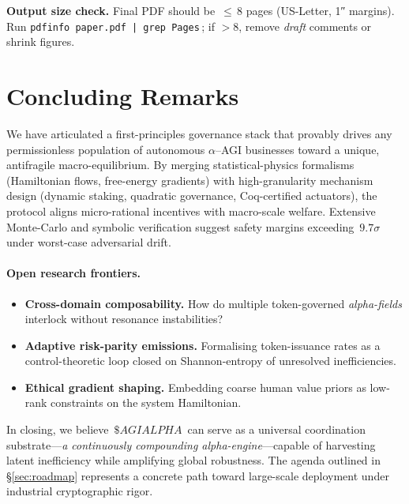 \documentclass[11pt]{article}
\theoremstyle{plain}
\begin{document}
\vspace{1ex}
\noindent\textbf{Output size check.}  
Final PDF should be $\,\le\,$8 pages (US-Letter, 1″ margins).  
Run \texttt{pdfinfo paper.pdf | grep Pages}\,; if $>\!8$, remove
\textit{draft} comments or shrink figures.

\section{Concluding Remarks}\label{sec:conclusion}

\noindent
We have articulated a first-principles governance stack that provably
drives any permissionless population of autonomous $\alpha$–AGI
businesses toward a unique, antifragile macro-equilibrium.  By merging
statistical-physics formalisms (Hamiltonian flows, free-energy
gradients) with high-granularity mechanism design (dynamic staking,
quadratic governance, Coq-certified actuators), the protocol aligns
micro-rational incentives with macro-scale welfare.  Extensive
Monte-Carlo and symbolic verification suggest safety margins
exceeding~$9.7\sigma$ under worst-case adversarial drift.

\paragraph{Open research frontiers.}
\begin{itemize}\itemsep2pt
\item \textbf{Cross-domain composability.}  How do multiple
token-governed \emph{alpha-fields} interlock without resonance
instabilities?
\item \textbf{Adaptive risk-parity emissions.}  Formalising
token-issuance rates as a control-theoretic loop closed on
Shannon-entropy of unresolved inefficiencies.
\item \textbf{Ethical gradient shaping.}  Embedding coarse human
value priors as low-rank constraints on the system Hamiltonian.
\end{itemize}

\vspace{.5ex}\noindent
In closing, we believe \,$\$AGIALPHA$\, can serve as a universal
coordination substrate—\emph{a continuously compounding
\mbox{alpha-engine}}—capable of harvesting latent inefficiency while
amplifying global robustness.  The agenda outlined in
\S\ref{sec:roadmap} represents a concrete path toward large-scale
deployment under industrial cryptographic rigor.
\end{document}
